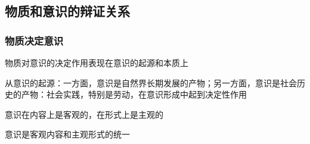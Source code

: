 \subsection{物质和意识的辩证关系}%
\label{sub:物质和意识的辩证关系}
\subsubsection*{物质决定意识}%
\label{subsub:物质决定意识}
物质对意识的决定作用表现在意识的起源和本质上

从意识的起源：一方面，意识是自然界长期发展的产物；另一方面，意识是社会历史的产物：社会实践，特别是劳动，在意识形成中起到决定性作用

\begin{notation}
    意识在内容上是客观的，在形式上是主观的

    意识是客观内容和主观形式的统一
\end{notation}

